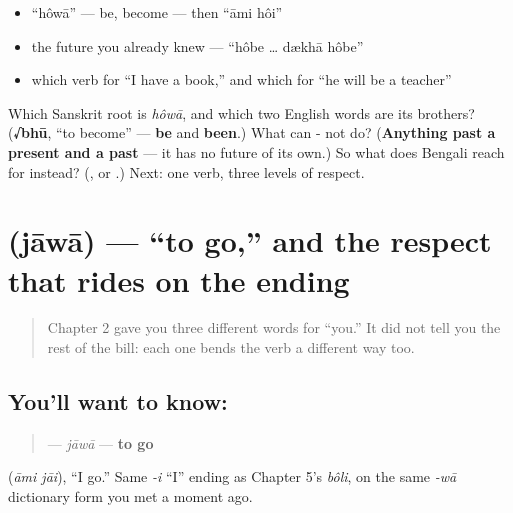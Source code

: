 \begin{itemize}
\raggedright
  \item \textquotedblleft{}hôwā\textquotedblright{} — be, become — then \textquotedblleft{}āmi hôi\textquotedblright{}
  \item the future you already knew — \textquotedblleft{}hôbe … dækhā hôbe\textquotedblright{}
  \item which verb for \textquotedblleft{}I have a book,\textquotedblright{} and which for \textquotedblleft{}he will be a teacher\textquotedblright{}
\end{itemize}

\begin{tcolorbox}[breakable,colback=teal!4,colframe=teal!35!black,title={Before you move on}]
Which Sanskrit root is \emph{hôwā}, and which two English words are its brothers? (\textbf{√bhū}, \textquotedblleft{}to become\textquotedblright{} — \textbf{be} and \textbf{been}.) What can - not do? (\textbf{Anything past a present and a past} — it has no future of its own.) So what does Bengali reach for instead? (\textbf{}, or .) Next: one verb, three levels of respect.
\end{tcolorbox}
\section[jāwā]{ (jāwā) — \textquotedblleft{}to go,\textquotedblright{} and the respect that rides on the ending}

\label{lesson:BN-C07-jaowa}



\begin{quote}
Chapter 2 gave you three different words for \textquotedblleft{}you.\textquotedblright{} It did not tell you the rest of the bill: each one bends the verb a different way too.
\end{quote}

\subsection*{You'll want to know: }
\begin{quote}
\textbf{} — \emph{jāwā} — \textbf{to go}
\end{quote}

  (\emph{āmi jāi}), \textquotedblleft{}I go.\textquotedblright{} Same \emph{-i} \textquotedblleft{}I\textquotedblright{} ending as Chapter 5's \emph{bôli}, on the same \emph{-wā} dictionary form you met a moment ago.

